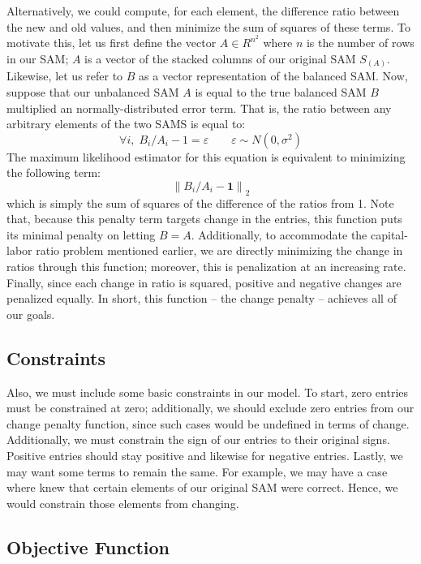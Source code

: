 \documentclass[12pt]{article}
\begin{document}
	Alternatively, we could compute, for each element, the difference ratio between the new and old values, and then minimize the sum of squares of these terms. To motivate this, let us first define the vector $A \in R^{n^2}$ where $n$ is the number of rows in our SAM; $A$ is a vector of the stacked columns of our original SAM $S_{(A)}$. Likewise, let us refer to $B$ as a vector representation of the balanced SAM. Now, suppose that our unbalanced SAM $A$ is equal to the true balanced SAM $B$ multiplied an normally-distributed error term. That is, the ratio between any arbitrary elements of the two SAMS is equal to:
	$$\forall i, \; B_{i} /A_{i} - 1=   \varepsilon \qquad \varepsilon \sim N(0,\sigma^2)$$
	The maximum likelihood estimator for this equation is equivalent to minimizing the following term:
	$$ \left\| B_{i} /A_{i} - \textbf{1} \right\|_2$$
	which is simply the sum of squares of the difference of the ratios from 1. Note that, because this penalty term targets change in the entries, this function puts its minimal penalty on letting $B = A$. Additionally, to accommodate the capital-labor ratio problem mentioned earlier, we are directly minimizing the change in ratios through this function; moreover, this is penalization at an increasing rate.  Finally, since each change in ratio is squared, positive and negative changes are penalized equally. In short, this function -- the change penalty -- achieves all of our goals. 
	
	\subsection{Constraints}
	
	Also, we must include some basic constraints in our model. To start, zero entries must be constrained at zero; additionally, we should exclude zero entries from our change penalty function, since such cases would be undefined in terms of change. Additionally, we must constrain the sign of our entries to their original signs. Positive entries should stay positive and likewise for negative entries. Lastly, we may want some terms to remain the same. For example, we may have a case where knew that certain elements of our original SAM were correct. Hence, we would constrain those elements from changing.  
	
	\subsection{Objective Function}
	
\end{document}
